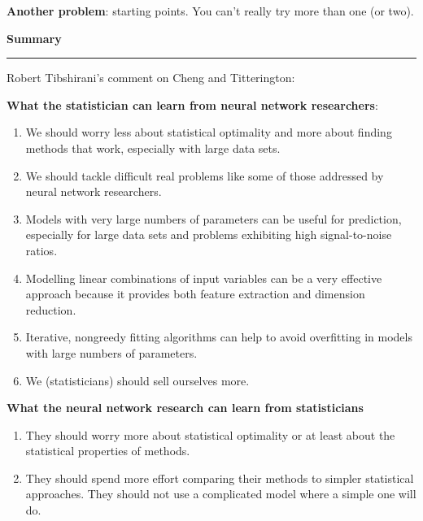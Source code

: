 \documentclass[12pt,letterpaper]{article}
\newcommand{\HRule}{\rule{\linewidth}{4pt}}
\newcommand{\vsphalf}{\vspace*{0.5cm}}
\begin{document}
\bigskip 

\textbf{Another problem}: starting points.  You can't really try more
than one (or two).  


\newpage

\fontsize{30}{30} \selectfont

\centerline{\textbf{Summary}}

\HRule

\vsphalf

\fontsize{20}{25} \selectfont

Robert Tibshirani's comment on Cheng and Titterington:

\bigskip

\fontsize{18}{20} \selectfont

\textbf{What the statistician can learn from neural network researchers}:

\begin{enumerate}
\item We should worry less about statistical optimality and more about
  finding methods that work, especially with large data sets.
\item We should tackle difficult real problems like some of those
  addressed by neural network researchers.  
\item Models with very large numbers of parameters can be useful for
  prediction, especially for large data sets and problems exhibiting
  high signal-to-noise ratios.
\item Modelling linear combinations of input variables can be a very
  effective approach because it provides both feature extraction and
  dimension reduction.
\item Iterative, nongreedy fitting algorithms can help to avoid
  overfitting in models with large numbers of parameters.
\item We (statisticians) should sell ourselves more.
\end{enumerate}

\bigskip

\textbf{What the neural network research can learn from statisticians}

\begin{enumerate}
\item They should worry more about statistical optimality or at least
  about the statistical properties of methods.
\item They should spend more effort comparing their methods to simpler
  statistical approaches.  They should not use a complicated model
  where a simple one will do.
\end{enumerate}
\end{document}
